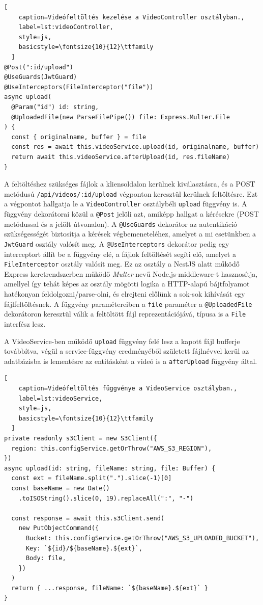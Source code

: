 \begin{minipage}{0.92\textwidth}
  \begin{lstlisting}[
    caption=Videófeltöltés kezelése a VideoController osztályban.,
    label=lst:videoController,
    style=js,
    basicstyle=\fontsize{10}{12}\ttfamily
  ]
@Post(":id/upload")
@UseGuards(JwtGuard)
@UseInterceptors(FileInterceptor("file"))
async upload(
  @Param("id") id: string,
  @UploadedFile(new ParseFilePipe()) file: Express.Multer.File
) {
  const { originalname, buffer } = file
  const res = await this.videoService.upload(id, originalname, buffer)
  return await this.videoService.afterUpload(id, res.fileName)
}
\end{lstlisting}
\end{minipage}

A feltöltéshez szükséges fájlok a kliensoldalon kerülnek kiválasztásra, és a POST metódusú \verb|/api/videos/:id/upload| végponton keresztül kerülnek feltöltésre. Ezt a végpontot hallgatja le a \verb|VideoController| osztálybéli \verb|upload| függvény is. A függvény dekorátorai közül a \verb|@Post| jelöli azt, amiképp hallgat a kérésekre (POST metódussal és a jelölt útvonalon). A \verb|@UseGuards| dekorátor az autentikáció szükségességét biztosítja a kérések végbemeneteléhez, amelyet a mi esetünkben a \verb|JwtGuard| osztály valósít meg. A \verb|@UseInterceptors| dekorátor pedig egy interceptort állít be a függvény elé, a fájlok feltöltését segíti elő, amelyet a \verb|FileInterceptor| osztály valósít meg. Ez az osztály a NestJS alatt működő Express keretrendszerben működő \emph{Multer} nevű Node.js-middleware-t hasznosítja, amellyel így tehát képes az osztály mögötti logika a HTTP-alapú bájtfolyamot hatékonyan feldolgozni/parse-olni, és elrejteni előlünk a sok-sok kihívását egy fájlfeltöltésnek. A függvény paramétereiben a \verb|file| paraméter a \verb|@UploadedFile| dekorátoron keresztül válik a feltöltött fájl reprezentációjává, típusa is a \verb|File| interfész lesz.

A VideoService-ben működő \verb|upload| függvény felé lesz a kapott fájl bufferje továbbítva, végül a service-függvény eredményéből született fájlnévvel kerül az adatbázisba is lementésre az entitásként a videó is a \verb|afterUpload| függvény által.

\begin{minipage}{0.92\textwidth}
  \begin{lstlisting}[
    caption=Videófeltöltés függvénye a VideoService osztályban.,
    label=lst:videoService,
    style=js,
    basicstyle=\fontsize{10}{12}\ttfamily
  ]
private readonly s3Client = new S3Client({
  region: this.configService.getOrThrow("AWS_S3_REGION"),
})
async upload(id: string, fileName: string, file: Buffer) {
  const ext = fileName.split(".").slice(-1)[0]
  const baseName = new Date()
    .toISOString().slice(0, 19).replaceAll(":", "-")

  const response = await this.s3Client.send(
    new PutObjectCommand({
      Bucket: this.configService.getOrThrow("AWS_S3_UPLOADED_BUCKET"),
      Key: `${id}/${baseName}.${ext}`,
      Body: file,
    })
  )
  return { ...response, fileName: `${baseName}.${ext}` }
}
\end{lstlisting}
\end{minipage}

